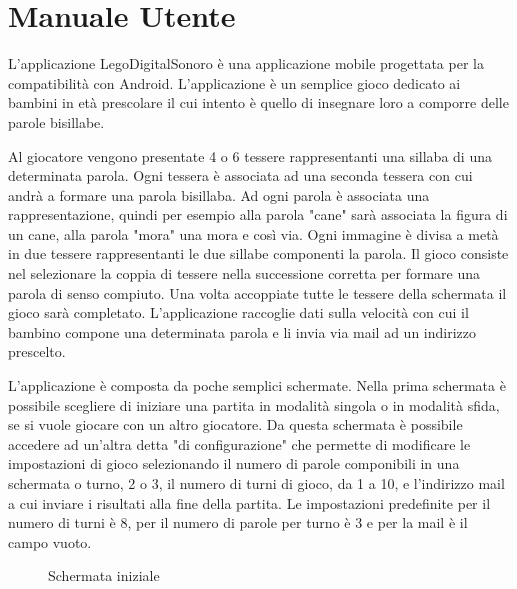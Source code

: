 \renewcommand*{\mypath}{legodigitalsonoro1}%
\graphicspath{{\mypath/images/}}

\localtoc

\newcommand{\includefigure}[2]{
\begin{figure}[h!]
\centering{
\texttt{[image: \#1.png]}}
\caption{#2}
\label{fig:#1}
\end{figure}
}

\section{Manuale Utente}

L'applicazione LegoDigitalSonoro è una applicazione mobile progettata per la compatibilità con Android. L'applicazione è un semplice gioco dedicato ai bambini in età prescolare il cui intento è quello di insegnare loro a comporre delle parole bisillabe.

Al giocatore vengono presentate 4 o 6 tessere rappresentanti una sillaba di una determinata parola. Ogni tessera è associata ad una seconda tessera con cui andrà a formare una parola bisillaba. Ad ogni parola è associata una rappresentazione, quindi per esempio alla parola "cane" sarà associata la figura di un cane, alla parola "mora" una mora e così via. Ogni immagine è divisa a metà in due tessere rappresentanti le due sillabe componenti la parola. Il gioco consiste nel selezionare la coppia di tessere nella successione corretta per formare una parola di senso compiuto. Una volta accoppiate tutte le tessere della schermata il gioco sarà completato. L'applicazione raccoglie dati sulla velocità con cui il bambino compone una determinata parola e li invia via mail ad un indirizzo prescelto.

L'applicazione è composta da poche semplici schermate. Nella prima schermata è possibile scegliere di iniziare una partita in modalità singola o in modalità sfida, se si vuole giocare con un altro giocatore. Da questa schermata è possibile accedere ad un'altra detta "di configurazione" che permette di modificare le impostazioni di gioco selezionando il numero di parole componibili in una schermata o turno, 2 o 3, il numero di turni di gioco, da 1 a 10, e l'indirizzo mail a cui inviare i risultati alla fine della partita. Le impostazioni predefinite per il numero di turni è 8, per il numero di parole per turno è 3 e per la mail è il campo vuoto.

\includefigure{main}{Schermata iniziale}

